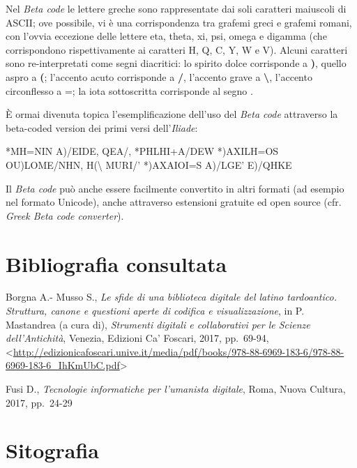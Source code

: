 \documentclass[
  b5paper,
  twoside,
  11pt,
  chapterprefix=false,
  bibliography=totocnumbered,
  parskip=0]{scrbook}
\begin{document}
Nel \emph{Beta code} le lettere greche sono rappresentate dai soli caratteri
maiuscoli di ASCII; ove possibile, vi è una corrispondenza tra grafemi
greci e grafemi romani, con l'ovvia eccezione delle lettere eta, theta,
xi, psi, omega e digamma (che corrispondono rispettivamente ai caratteri
H, Q, C, Y, W e V). Alcuni caratteri sono re-interpretati come segni
diacritici: lo spirito dolce corrisponde a \textbf{)}, quello aspro a \textbf{(};
l'accento acuto corrisponde a \textbf{/}, l'accento grave a \textbf{\textbackslash{}}, l'accento
circonflesso a =; la iota sottoscritta corrisponde al segno \textbar.

È ormai divenuta topica l'esemplificazione dell'uso del \emph{Beta code}
attraverso la beta-coded version dei primi versi dell'\emph{Iliade}:

*MH=NIN A)/EIDE, QEA/, *PHLHI+A/DEW *)AXILH=OS\\
OU)LOME/NHN, H(\textbackslash{} MURI/' *)AXAIOI=S A)/LGE' E)/QHKE

Il \emph{Beta code} può anche essere facilmente convertito in altri formati
(ad esempio nel formato Unicode), anche attraverso estensioni gratuite
ed open source (cfr. \emph{Greek Beta code converter}).

\hypertarget{bibliografia-consultata-2}{%
\section*{Bibliografia consultata}\label{bibliografia-consultata-2}}

Borgna A.- Musso S., \emph{Le sfide di una biblioteca digitale del latino
tardoantico. Struttura, canone e questioni aperte di codifica e
visualizzazione}, in P. Mastandrea (a cura di), \emph{Strumenti digitali e
collaborativi per le Scienze dell'Antichità}, Venezia, Edizioni Ca'
Foscari, 2017, pp.~69-94,
\textless{}\href{http://edizionicafoscari.unive.it/media/pdf/books/978-88-6969-183-6/978-88-6969-183-6_IhKmUbC.pdf}{{http://edizionicafoscari.unive.it/media/pdf/books/978-88-6969-183-6/978-88-6969-183-6\_IhKmUbC.pdf}}\textgreater{}

Fusi D., \emph{Tecnologie informatiche per l'umanista digitale}, Roma, Nuova
Cultura, 2017, pp.~24-29

\hypertarget{sitografia-1}{%
\section*{Sitografia}\label{sitografia-1}}
\end{document}
